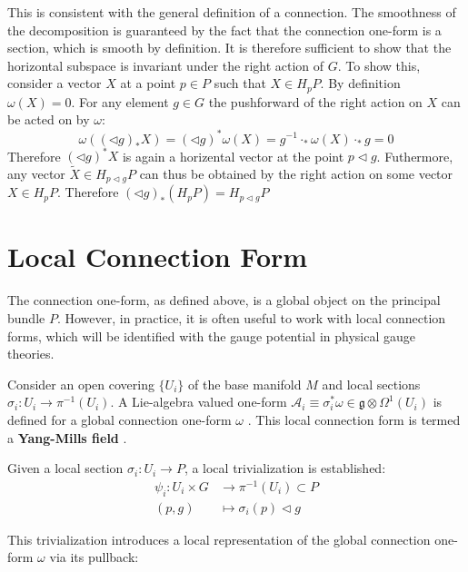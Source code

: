 This is consistent with the general definition of a connection. The smoothness of the decomposition is guaranteed by the fact that the connection one-form is a section, which is smooth by definition. It is therefore sufficient to show that the horizontal subspace is invariant under the right action of \( G \).
To show this, consider a vector $X$ at a point $p \in P$ such that $X \in H_pP$. By definition $\omega(X) = 0$. For any element $g \in G$ the pushforward of the right action on $X$ can be acted on by $\omega$\cite{NakaharaGeometrytopologyphysics2005}:
\[ \omega((\triangleleft g)_* X) = (\triangleleft g)^* \omega(X) = g^{-1} \cdot_* \omega(X) \cdot_* g = 0 \]
Therefore $(\triangleleft g)^* X$ is again a horizental vector at the point $p\triangleleft g$. Futhermore, any vector $\tilde{X} \in H_{p\triangleleft g}P$ can thus be obtained by the right action on some vector $X \in H_pP$. Therefore $ (\triangleleft g)_* (H_pP) = H_{p \triangleleft g}P $


\section{Local Connection Form}

The connection one-form, as defined above, is a global object on the principal bundle \( P \). However, in practice, it is often useful to work with local connection forms, which will be identified with the gauge potential in physical gauge theories.

Consider an open covering \( \{U_i\} \) of the base manifold \( M \) and local sections \( \sigma_i : U_i \rightarrow \pi^{-1}(U_i) \). A Lie-algebra valued one-form \( \mathcal{A}_i \equiv \sigma_i^* \omega \in \mathfrak{g} \otimes\Omega^1(U_i) \) is defined for a global connection one-form \( \omega \) \cite{NakaharaGeometrytopologyphysics2005}. This local connection form is termed a \textbf{Yang-Mills field} \cite{FredericSchullerLocalrepresentationsconnectionbasemanifoldYangMillsfieldsLec222015}.

Given a local section \( \sigma_i : U_i \to P \), a local trivialization is established:
\begin{align*}
  \psi_i : U_i \times G &\longrightarrow \pi^{-1}(U_i) \subset P \\
  (p, g) &\mapsto \sigma_i(p) \triangleleft g
\end{align*}

This trivialization introduces a local representation of the global connection one-form \( \omega \) via its pullback:

